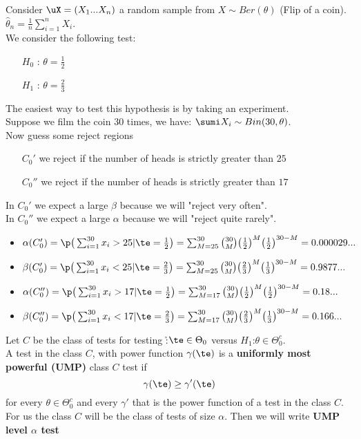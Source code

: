 \begin{eg}
	Consider $\uX=(X_1 ... X_n)$ a random sample from $X\sim Ber(\theta)$ (Flip of a coin).\\
	$\hat \theta_n=\frac{1}{n}\sum_{i=1}^{n}X_i$.\\
	We consider the following test:
	\begin{itemize}
		\item[$H_0$]: $\theta=\frac{1}{2}$
		\item[$H_1$]: $\theta=\frac{2}{3}$
	\end{itemize}
	The easiest way to test this hypothesis is by taking an experiment.\\
	Suppose we film the coin $30$ times, we have:
	$\sumi X_i\sim Bin(30,\theta)$.\\
	Now guess some reject regions
	\begin{itemize}
		\item[$C_0'$] we reject \h if the number of heads is strictly greater than $25$
		\item[$C_0''$] we reject \h if the number of heads is strictly greater than $17$
	\end{itemize}
	In $C_0'$ we expect a large $\beta$ because we will "reject very often".\\
	In $C_0''$ we expect a large $\alpha$ because we will "reject quite rarely".\\
	\begin{itemize}
		\item $\alpha(C_0') = \p \big( \sum_{i=1}^{30} x_i > 25 | \te = \frac{1}{2} \big) = \sum_{M=25}^{30} \binom{30}{M} \big(\frac{1}{2}\big)^M \big( \frac{1}{2} \big)^{30-M}=0.000029...$
		\item $\beta(C_0') = \p \big( \sum_{i=1}^{30} x_i < 25 | \te = \frac{2}{3} \big) = \sum_{M=25}^{30} \binom{30}{M} \big(\frac{2}{3}\big)^M \big( \frac{1}{3} \big)^{30-M}=0.9877...$
		\item $\alpha(C_0'') = \p \big( \sum_{i=1}^{30} x_i > 17 | \te = \frac{1}{2} \big) = \sum_{M=17}^{30} \binom{30}{M} \big(\frac{1}{2}\big)^M \big( \frac{1}{2} \big)^{30-M}=0.18...$
		\item $\beta(C_0'') = \p \big( \sum_{i=1}^{30} x_i < 17 | \te = \frac{2}{3} \big) = \sum_{M=17}^{30} \binom{30}{M} \big(\frac{2}{3}\big)^M \big( \frac{1}{3} \big)^{30-M}=0.166...$
	\end{itemize}
\end{eg}
\begin{defi}
	Let $C$ be the class of tests for testing \h :$\te \in \Theta_0$ versus $H_1$:$\theta \in \Theta_0^c$.\\
	A test in the class $C$, with power function $\gamma(\te)$ is a \textbf{uniformly most powerful (UMP)} class $C$ test if
	$$\gamma(\te)\geq \gamma'(\te)$$
	for every $\theta \in \Theta_0^c$ and every $\gamma'$ that is the power function of a test in the class $C$.\\
	For us the class $C$ will be the class of tests of size $\alpha$. Then we will write \textbf{UMP level $\alpha$ test}
\end{defi}

